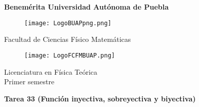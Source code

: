 \documentclass[12pt]{article}
\begin{document}
\begingroup
\begin{titlepage}
	\noindent
	\vspace{1mm}
\end{titlepage}
\endgroup

\pagestyle{empty} 
\setlength{\parindent}{0pt}
\sffamily


\begin{center} 

    \LARGE{\bf{\textsf{Benemérita Universidad Autónoma de Puebla}}} \\[0.5cm]
    
\begin{figure}[htb] \centering

    \texttt{[image: LogoBUAPpng.png]} 

\end{figure}


    \LARGE{Facultad de Ciencias Físico Matemáticas}\\[0.5cm]

\begin{figure}[htb] \centering

    \texttt{[image: LogoFCFMBUAP.png]} 
    
\end{figure} 


    \Large{Licenciatura en Física Teórica}\\[0.5cm]
    \Large{Primer semestre} 

\end{center} \vspace{0.3cm}

\begin{center}

    {\Large{\bfseries{{\textcolor{Mahogany}{Tarea 33  (Función inyectiva, sobreyectiva y biyectiva)}}}}} \\ 
    
\end{center}
\end{document}
